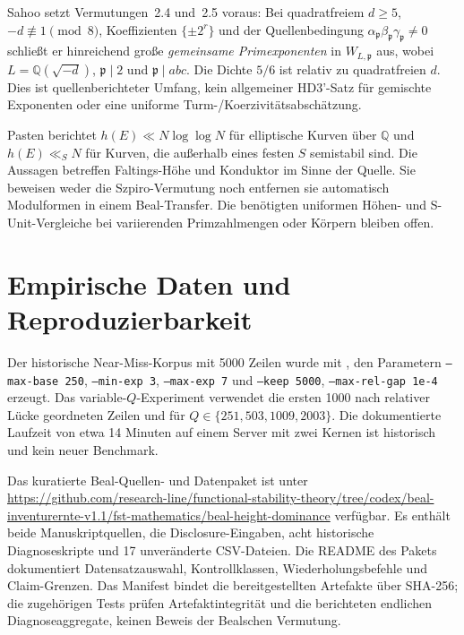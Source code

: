 \documentclass[11pt,a4paper]{article}
\begin{document}
Sahoo \cite[Satz~1.10, Proposition~1.12]{Sahoo2026} setzt
Vermutungen~2.4 und~2.5 voraus: Bei quadratfreiem $d\ge5$,
$-d\not\equiv1\pmod8$, Koeffizienten $\{\pm2^r\}$ und der
Quellenbedingung
$\alpha_{\mathfrak p}\beta_{\mathfrak p}\gamma_{\mathfrak p}\ne0$
schließt er hinreichend große \emph{gemeinsame Primexponenten}
in $W_{L,\mathfrak p}$ aus, wobei
$L=\mathbb Q(\sqrt{-d})$, $\mathfrak p\mid2$ und
$\mathfrak p\mid abc$.
Die Dichte $5/6$ ist relativ zu quadratfreien $d$.
Dies ist quellenberichteter Umfang, kein allgemeiner HD3'-Satz
für gemischte Exponenten oder eine uniforme Turm-/Koerzivitätsabschätzung.

Pasten \cite[Korollare~1.2--1.3]{Pasten2026} berichtet
$h(E)\ll N\log\log N$ für elliptische Kurven über $\mathbb Q$
und $h(E)\ll_S N$ für Kurven, die außerhalb eines festen $S$
semistabil sind. Die Aussagen betreffen Faltings-Höhe und
Konduktor im Sinne der Quelle.
Sie beweisen weder die Szpiro-Vermutung noch entfernen sie
automatisch Modulformen in einem Beal-Transfer.
Die benötigten uniformen Höhen- und S-Unit-Vergleiche bei
variierenden Primzahlmengen oder Körpern bleiben offen.

\appendix

\section{Empirische Daten und Reproduzierbarkeit}
\label{app:data}

Der historische Near-Miss-Korpus mit 5000 Zeilen wurde mit
, den Parametern
\texttt{--max-base 250}, \texttt{--min-exp 3}, \texttt{--max-exp 7} und
\texttt{--keep 5000}, \texttt{--max-rel-gap 1e-4} erzeugt. Das variable-$Q$-Experiment
verwendet die ersten 1000 nach relativer Lücke geordneten Zeilen und
 für
$Q\in\{251,503,1009,2003\}$. Die dokumentierte Laufzeit von etwa
14 Minuten auf einem Server mit zwei Kernen ist historisch und kein
neuer Benchmark.

Das kuratierte Beal-Quellen- und Datenpaket ist unter
\url{https://github.com/research-line/functional-stability-theory/tree/codex/beal-inventurernte-v1.1/fst-mathematics/beal-height-dominance}
verfügbar. Es enthält beide Manuskriptquellen, die Disclosure-Eingaben,
acht historische Diagnoseskripte und 17 unveränderte CSV-Dateien.
Die README des Pakets dokumentiert Datensatzauswahl, Kontrollklassen,
Wiederholungsbefehle und Claim-Grenzen. Das Manifest bindet die
bereitgestellten Artefakte über SHA-256; die zugehörigen Tests prüfen
Artefaktintegrität und die berichteten endlichen Diagnoseaggregate,
keinen Beweis der Bealschen Vermutung.
\end{document}
